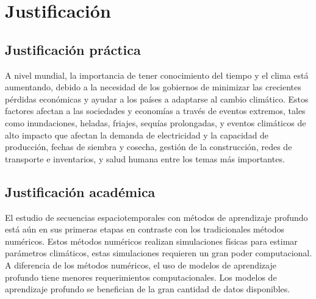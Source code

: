 \section{Justificación}
\subsection{Justificación práctica}

A nivel mundial, la importancia de tener conocimiento del tiempo y el clima 
está aumentando, debido a la necesidad de los gobiernos de minimizar las
crecientes pérdidas económicas y ayudar a los países a adaptarse al cambio
climático. Estos factores afectan a las sociedades y economías a través de 
eventos extremos, tales como inundaciones, heladas, friajes, sequías 
prolongadas, y eventos climáticos de alto impacto que afectan la demanda de 
electricidad y la capacidad de producción, fechas de siembra y cosecha, gestión 
de la construcción, redes de transporte e inventarios, y salud humana entre los 
temas más importantes.
	
\subsection{Justificación académica}

El estudio de secuencias espaciotemporales con métodos de aprendizaje profundo 
está aún en sus primeras etapas en contraste con los tradicionales métodos 
numéricos. Estos métodos numéricos realizan simulaciones físicas para estimar
parámetros climáticos, estas simulaciones requieren un gran poder computacional.
A diferencia de los métodos numéricos, el uso de modelos de aprendizaje 
profundo tiene menores requerimientos computacionales. Los modelos de 
aprendizaje profundo se benefician de la gran cantidad de datos disponibles.




